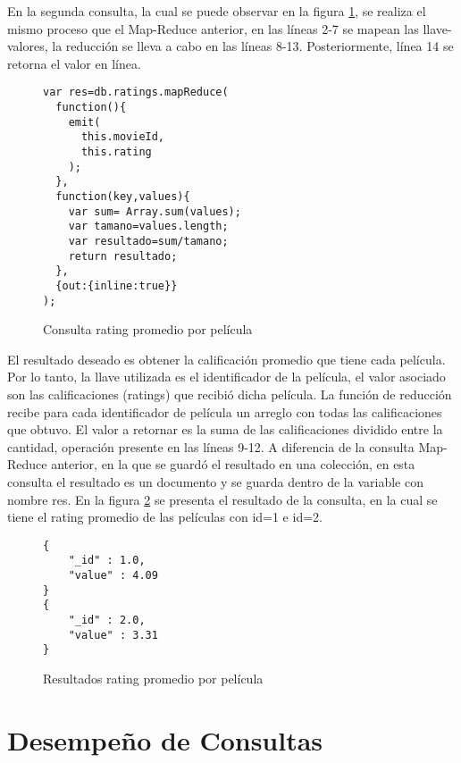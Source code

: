 \documentclass[conference,compsoc]{sty/IEEEtran}
\begin{document}
En la segunda consulta, la cual se puede observar en la figura \ref{fig:ConPorcentajeRating}, se realiza el mismo proceso que el Map-Reduce anterior, en las líneas 2-7 se mapean las llave-valores, la reducción se lleva a cabo en las líneas 8-13. Posteriormente, línea 14 se retorna el valor en línea.
\begin{figure}
    \begin{verbatim}
var res=db.ratings.mapReduce(
  function(){
    emit(
      this.movieId,
      this.rating
    );
  },
  function(key,values){
    var sum= Array.sum(values);
    var tamano=values.length;
    var resultado=sum/tamano;
    return resultado;
  },
  {out:{inline:true}}
);
\end{verbatim}
\caption{Consulta rating promedio por película} 
\label{fig:ConPorcentajeRating}
\end{figure}
El resultado deseado es obtener la calificación promedio que tiene cada película. Por lo tanto, la llave utilizada es el identificador de la película, el valor asociado son las calificaciones (ratings) que recibió dicha película. La función de reducción recibe para cada identificador de película un arreglo con todas las calificaciones que obtuvo. El valor a retornar es la suma de las calificaciones dividido entre la cantidad, operación presente en las líneas 9-12. A diferencia de la consulta Map-Reduce anterior, en la que se guardó el resultado en una colección, en esta consulta el resultado es un documento y se guarda dentro de la variable con nombre res. En la figura \ref{fig:ResPromedioRatings} se presenta el resultado de la consulta, en la cual se tiene el rating promedio de las películas con id=1 e id=2. 

\begin{figure}
    \begin{verbatim}
{
	"_id" : 1.0,
	"value" : 4.09
}
{
	"_id" : 2.0,
	"value" : 3.31
}
\end{verbatim}
\caption{Resultados rating promedio por película} 
\label{fig:ResPromedioRatings}
\end{figure}


\section{Desempeño de Consultas}
\end{document}
